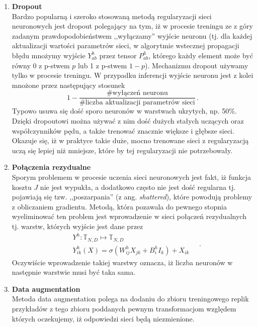 \documentclass{myclass}
\begin{document}
\begin{enumerate}
    \item \textbf{Dropout}\\
    Bardzo popularną i szeroko stosowaną metodą regularyzacji sieci neuronowych jest dropout
    polegający na tym, iż w procesie treningu ze z góry zadanym prawdopodobieństwem ,,wyłączamy''
    wyjście neuronu (tj. dla każdej aktualizacji wartości parametrów sieci, w algorytmie wstecznej
    propagacji błędu mnożymy wyjście \(Y_{ab}^h\) przez tensor \(P_{ab}^h\), którego każdy element
    może być równy \(0\) z p-stwem \(p\) lub 1 z p-stwem \(1-p\)). Mechanizmu dropout używamy tylko
    w procesie treningu. W przypadku inferencji wyjście neuronu jest z kolei mnożone przez
    następujący stosunek
    \begin{equation*}
        1 - \frac{\# \text{wyłączeń neuronu}}{\# \text{liczba aktualizacji parametrów sieci}}\,.
    \end{equation*}
    Typowo usuwa się dość sporo neuronów w warstwach ukrytych, np. 50\%. Dzięki dropoutowi można
    używać z nim dość dużych stałych uczących oraz współczynników pędu, a także trenować znacznie
    większe i głębsze sieci. Okazuje się, iż w praktyce takie duże, mocno trenowane sieci z
    regularyzacją uczą się lepiej niż mniejsze, które by tej regularyzacji nie potrzebowały.
    
    \item \textbf{Połączenia rezydualne}\\
    Sporym problemem w procesie uczenia sieci neuronowych jest fakt, iż funkcja kosztu \(J\) nie
    jest wypukła, a dodatkowo często nie jest dość regularna tj. pojawiają się tzw. ,,poszarpania''
    (z ang. \textit{shattered}), które powodują problemy z obliczaniem gradientu. Metodą, która
    pozawala do pewnego stopnia wyeliminować ten problem jest wprowadzenie w sieci połączeń
    rezydualnych tj. warstw, których wyjście jest dane przez
    \begin{equation*}
        \begin{split}
            &Y^h: \mathbb{T}_{N, D} \mapsto \mathbb{T}_{N,D}\\
            &Y^h_{ik}(X) = \sigma\left(W_{ij}^h X_{jk} + B_{i}^h I_k\right) + X_{ik}
        \end{split}\quad.
    \end{equation*}
    Oczywiście wprowadzenie takiej warstwy oznacza, iż liczba neuronów w następnie warstwie musi być
    taka sama.

    \item \textbf{Data augmentation}\\
    Metoda data augmentation polega na dodaniu do zbioru treningowego replik przykładów z tego
    zbioru poddanych pewnym transformacjom względem których oczekujemy, iż odpowiedzi sieci będą
    niezmienione.

\end{enumerate}
\end{document}

